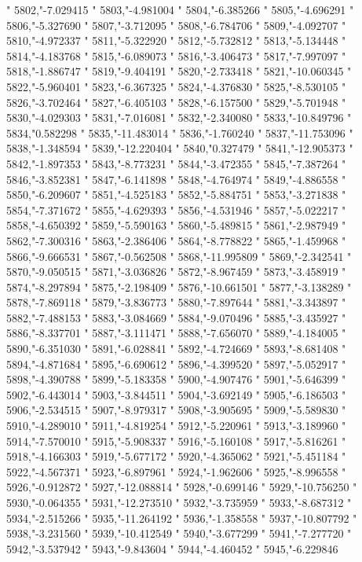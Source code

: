 "
5802,"-7.029415
"
5803,"-4.981004
"
5804,"-6.385266
"
5805,"-4.696291
"
5806,"-5.327690
"
5807,"-3.712095
"
5808,"-6.784706
"
5809,"-4.092707
"
5810,"-4.972337
"
5811,"-5.322920
"
5812,"-5.732812
"
5813,"-5.134448
"
5814,"-4.183768
"
5815,"-6.089073
"
5816,"-3.406473
"
5817,"-7.997097
"
5818,"-1.886747
"
5819,"-9.404191
"
5820,"-2.733418
"
5821,"-10.060345
"
5822,"-5.960401
"
5823,"-6.367325
"
5824,"-4.376830
"
5825,"-8.530105
"
5826,"-3.702464
"
5827,"-6.405103
"
5828,"-6.157500
"
5829,"-5.701948
"
5830,"-4.029303
"
5831,"-7.016081
"
5832,"-2.340080
"
5833,"-10.849796
"
5834,"0.582298
"
5835,"-11.483014
"
5836,"-1.760240
"
5837,"-11.753096
"
5838,"-1.348594
"
5839,"-12.220404
"
5840,"0.327479
"
5841,"-12.905373
"
5842,"-1.897353
"
5843,"-8.773231
"
5844,"-3.472355
"
5845,"-7.387264
"
5846,"-3.852381
"
5847,"-6.141898
"
5848,"-4.764974
"
5849,"-4.886558
"
5850,"-6.209607
"
5851,"-4.525183
"
5852,"-5.884751
"
5853,"-3.271838
"
5854,"-7.371672
"
5855,"-4.629393
"
5856,"-4.531946
"
5857,"-5.022217
"
5858,"-4.650392
"
5859,"-5.590163
"
5860,"-5.489815
"
5861,"-2.987949
"
5862,"-7.300316
"
5863,"-2.386406
"
5864,"-8.778822
"
5865,"-1.459968
"
5866,"-9.666531
"
5867,"-0.562508
"
5868,"-11.995809
"
5869,"-2.342541
"
5870,"-9.050515
"
5871,"-3.036826
"
5872,"-8.967459
"
5873,"-3.458919
"
5874,"-8.297894
"
5875,"-2.198409
"
5876,"-10.661501
"
5877,"-3.138289
"
5878,"-7.869118
"
5879,"-3.836773
"
5880,"-7.897644
"
5881,"-3.343897
"
5882,"-7.488153
"
5883,"-3.084669
"
5884,"-9.070496
"
5885,"-3.435927
"
5886,"-8.337701
"
5887,"-3.111471
"
5888,"-7.656070
"
5889,"-4.184005
"
5890,"-6.351030
"
5891,"-6.028841
"
5892,"-4.724669
"
5893,"-8.681408
"
5894,"-4.871684
"
5895,"-6.690612
"
5896,"-4.399520
"
5897,"-5.052917
"
5898,"-4.390788
"
5899,"-5.183358
"
5900,"-4.907476
"
5901,"-5.646399
"
5902,"-6.443014
"
5903,"-3.844511
"
5904,"-3.692149
"
5905,"-6.186503
"
5906,"-2.534515
"
5907,"-8.979317
"
5908,"-3.905695
"
5909,"-5.589830
"
5910,"-4.289010
"
5911,"-4.819254
"
5912,"-5.220961
"
5913,"-3.189960
"
5914,"-7.570010
"
5915,"-5.908337
"
5916,"-5.160108
"
5917,"-5.816261
"
5918,"-4.166303
"
5919,"-5.677172
"
5920,"-4.365062
"
5921,"-5.451184
"
5922,"-4.567371
"
5923,"-6.897961
"
5924,"-1.962606
"
5925,"-8.996558
"
5926,"-0.912872
"
5927,"-12.088814
"
5928,"-0.699146
"
5929,"-10.756250
"
5930,"-0.064355
"
5931,"-12.273510
"
5932,"-3.735959
"
5933,"-8.687312
"
5934,"-2.515266
"
5935,"-11.264192
"
5936,"-1.358558
"
5937,"-10.807792
"
5938,"-3.231560
"
5939,"-10.412549
"
5940,"-3.677299
"
5941,"-7.277720
"
5942,"-3.537942
"
5943,"-9.843604
"
5944,"-4.460452
"
5945,"-6.229846
